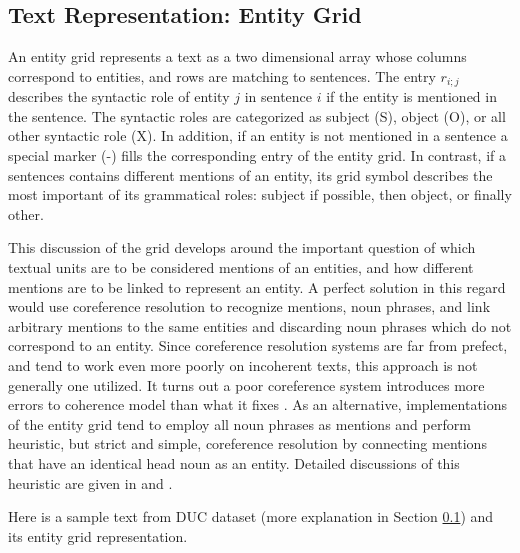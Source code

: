 \subsection{Text Representation: Entity Grid}
%
An entity grid represents a text as a two dimensional array whose columns correspond to entities, and rows are matching to sentences.
The entry $r_{i;j}$ describes the syntactic role of entity $j$ in sentence $i$ if the entity is mentioned in the sentence. 
The syntactic roles are categorized as subject (S), object (O), or all other syntactic role (X). 
In addition, if an entity is not mentioned in a sentence a special marker (-) fills the corresponding entry of the entity grid. 
In contrast, if a sentences contains different mentions of an entity, its grid symbol describes the most important of its grammatical roles: subject if possible, then object, or finally other. 


This discussion of the grid develops around the important question of which textual units are to be considered mentions of an entities, and how different mentions are to be linked to represent an entity.
A perfect solution in this regard would use coreference resolution to recognize mentions, noun phrases, and link arbitrary mentions to the same entities and discarding noun phrases which do not correspond to an entity. 
Since coreference resolution systems are far from prefect, and tend to work even more poorly on incoherent texts, this approach is not generally one utilized. 
It turns out a poor coreference system introduces more errors to coherence model than what it fixes \cite{barzilay05}.
As an alternative, implementations of the entity grid tend to employ all noun phrases as mentions and perform heuristic, but strict and simple, coreference resolution by connecting mentions that have an identical head noun as an entity. 
Detailed discussions of this heuristic are given in  and .

Here is a sample text from DUC dataset (more explanation in Section \ref{}) and its entity grid representation.

